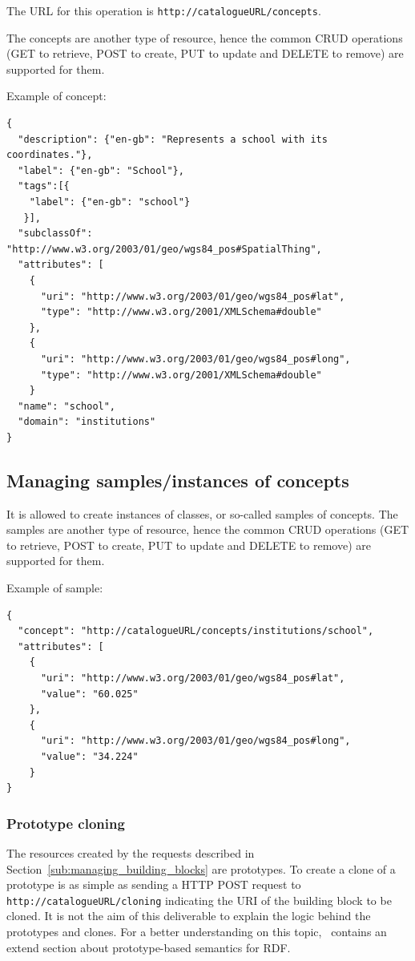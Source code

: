 \documentclass{fast_latex}
\begin{document}
The URL for this operation is \verb|http://catalogueURL/concepts|.

The concepts are another type of resource, hence the common CRUD operations (GET to retrieve, POST to create, PUT to update and DELETE to remove) are supported for them.

Example of concept:

\singlespacing
\begin{verbatim}
{          
  "description": {"en-gb": "Represents a school with its coordinates."}, 
  "label": {"en-gb": "School"},
  "tags":[{
    "label": {"en-gb": "school"}
   }],
  "subclassOf": "http://www.w3.org/2003/01/geo/wgs84_pos#SpatialThing",
  "attributes": [
    {
      "uri": "http://www.w3.org/2003/01/geo/wgs84_pos#lat",
      "type": "http://www.w3.org/2001/XMLSchema#double"
    },
    {
      "uri": "http://www.w3.org/2003/01/geo/wgs84_pos#long",
      "type": "http://www.w3.org/2001/XMLSchema#double"
    }
  "name": "school",
  "domain": "institutions"
}
\end{verbatim}
\doublespacing


\subsection{Managing samples/instances of concepts} %
\label{sub:managing_samples}

It is allowed to create instances of classes, or so-called samples of concepts. The samples are another type of resource, hence the common CRUD operations (GET to retrieve, POST to create, PUT to update and DELETE to remove) are supported for them.

Example of sample:

\singlespacing
\begin{verbatim}
{
  "concept": "http://catalogueURL/concepts/institutions/school",
  "attributes": [
    {
      "uri": "http://www.w3.org/2003/01/geo/wgs84_pos#lat",
      "value": "60.025"
    },
    {
      "uri": "http://www.w3.org/2003/01/geo/wgs84_pos#long",
      "value": "34.224"
    }
}
\end{verbatim}
\doublespacing


\subsubsection{Prototype cloning} %
\label{ssub:prototype_cloning}

The resources created by the requests described in Section~\ref{sub:managing_building_blocks} are prototypes. To create a clone of a prototype is as simple as sending a HTTP POST request to \verb|http://catalogueURL/cloning| indicating the URI of the building block to be cloned. It is not the aim of this deliverable to explain the logic behind the prototypes and clones. For a better understanding on this topic,~\cite{moeller2011fast_ontology} contains an extend section about prototype-based semantics for RDF.
\end{document}
